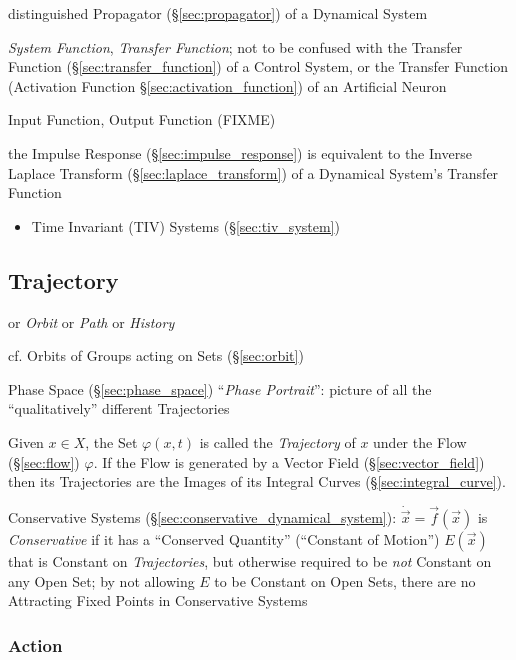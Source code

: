 distinguished Propagator (\S\ref{sec:propagator}) of a Dynamical System

\emph{System Function}, \emph{Transfer Function}; not to be confused with the
Transfer Function (\S\ref{sec:transfer_function}) of a Control System, or the
Transfer Function (Activation Function \S\ref{sec:activation_function}) of an
Artificial Neuron

\fist Input Function, Output Function (FIXME)

the Impulse Response (\S\ref{sec:impulse_response}) is equivalent to the Inverse
Laplace Transform (\S\ref{sec:laplace_transform}) of a Dynamical System's
Transfer Function

\begin{itemize}
  \item Time Invariant (TIV) Systems (\S\ref{sec:tiv_system})
\end{itemize}



\subsection{Trajectory}\label{sec:trajectory}

or \emph{Orbit} or \emph{Path} or \emph{History}

\fist cf. Orbits of Groups acting on Sets (\S\ref{sec:orbit})

Phase Space (\S\ref{sec:phase_space}) ``\emph{Phase Portrait}'': picture of all
the ``qualitatively'' different Trajectories

Given $x \in X$, the Set $\varphi(x,t)$ is called the \emph{Trajectory} of $x$
under the Flow (\S\ref{sec:flow}) $\varphi$. If the Flow is generated by a
Vector Field (\S\ref{sec:vector_field}) then its Trajectories are the Images of
its Integral Curves (\S\ref{sec:integral_curve}).

Conservative Systems (\S\ref{sec:conservative_dynamical_system}):
$\dot{\vec{x}} = \vec{f}(\vec{x})$ is \emph{Conservative} if it has a
``Conserved Quantity'' (``Constant of Motion'') $E(\vec{x})$ that is Constant
on \emph{Trajectories}, but otherwise required to be \emph{not} Constant on any
Open Set;
by not allowing $E$ to be Constant on Open Sets, there are no Attracting Fixed
Points in Conservative Systems



\subsubsection{Action}\label{sec:trajectory_action}

